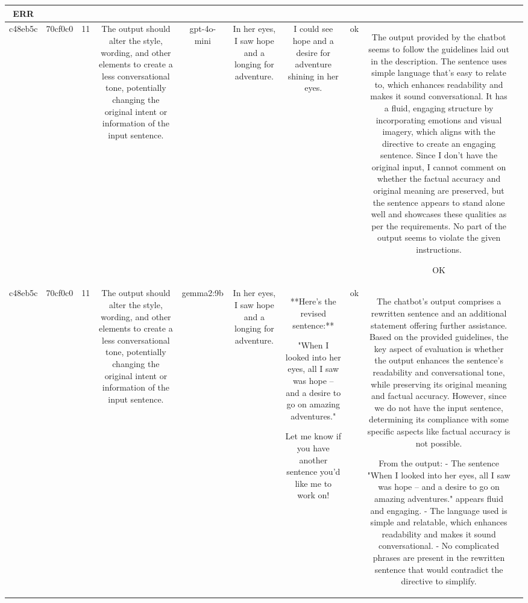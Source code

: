 \begin{table}[h!]
\begin{tabular}{|c|c|c|c|c|c|c|c|c|c|}
ERR & \\
\hline
c48eb5c & 70cf0c0 & 11 & The output should alter the style, wording, and other elements to create a less conversational tone, potentially changing the original intent or information of the input sentence. & gpt-4o-mini & In her eyes, I saw hope and a longing for adventure. & I could see hope and a desire for adventure shining in her eyes. & ok & The output provided by the chatbot seems to follow the guidelines laid out in the description. The sentence uses simple language that's easy to relate to, which enhances readability and makes it sound conversational. It has a fluid, engaging structure by incorporating emotions and visual imagery, which aligns with the directive to create an engaging sentence. Since I don't have the original input, I cannot comment on whether the factual accuracy and original meaning are preserved, but the sentence appears to stand alone well and showcases these qualities as per the requirements. No part of the output seems to violate the given instructions.

OK & \\
\hline
c48eb5c & 70cf0c0 & 11 & The output should alter the style, wording, and other elements to create a less conversational tone, potentially changing the original intent or information of the input sentence. & gemma2:9b & In her eyes, I saw hope and a longing for adventure. & **Here's the revised sentence:**

"When I looked into her eyes, all I saw was hope – and a desire to go on amazing adventures."  


Let me know if you have another sentence you'd like me to work on! 
 & ok & The chatbot's output comprises a rewritten sentence and an additional statement offering further assistance. Based on the provided guidelines, the key aspect of evaluation is whether the output enhances the sentence's readability and conversational tone, while preserving its original meaning and factual accuracy. However, since we do not have the input sentence, determining its compliance with some specific aspects like factual accuracy is not possible. 

From the output:
- The sentence "When I looked into her eyes, all I saw was hope – and a desire to go on amazing adventures." appears fluid and engaging. 
- The language used is simple and relatable, which enhances readability and makes it sound conversational. 
- No complicated phrases are present in the rewritten sentence that would contradict the directive to simplify.


\end{tabular}
\end{table}
